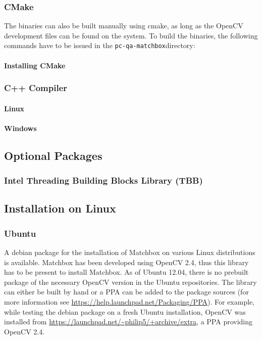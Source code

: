 \subsubsection{CMake}


The binaries can also be built manually using cmake, as long as the OpenCV development files can be found on the system.
To build the binaries, the following commands have to be issued in the \verb+pc-qa-matchbox+directory:

\paragraph{Installing CMake}



\subsubsection{C++ Compiler}


\paragraph{Linux}


\paragraph{Windows}



\subsection{Optional Packages}

\subsubsection{Intel Threading Building Blocks Library (TBB)}



\subsection{Installation on Linux}




\subsubsection{Ubuntu}
A debian package for the installation of Matchbox on various Linux distributions is available.
Matchbox has been developed using OpenCV 2.4, thus this library has to be present to install Matchbox. 
As of Ubuntu 12.04, there is no prebuilt package of the necessary OpenCV version in the Ubuntu repositories. 
The library can either be built by hand or a PPA can be added to the package sources (for more information see \url{https://help.launchpad.net/Packaging/PPA}). 
For example, while testing the debian package on a fresh Ubuntu installation, OpenCV was installed from \url{https://launchpad.net/~philip5/+archive/extra}, a PPA providing OpenCV 2.4. 

